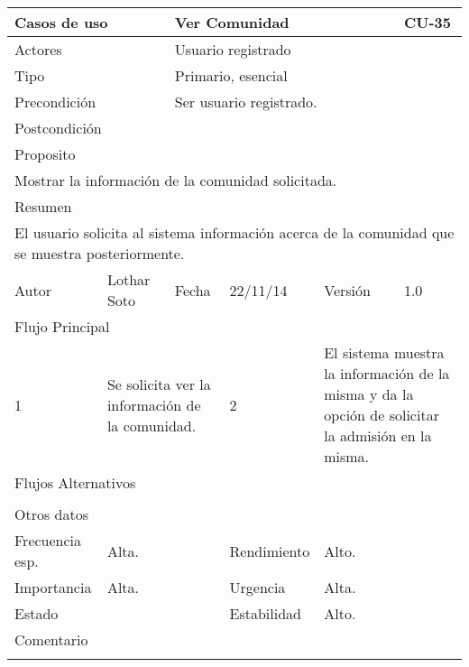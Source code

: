 \documentclass{article}
\begin{document}
\begin{table}[h]
\begin{tabular}{|l|l|l|l|l|l|}
\hline
\multicolumn{2}{|p{2cm}|}{Casos de uso}  & \multicolumn{3}{p{7cm}|}{Ver Comunidad} & CU-35 \\
\hline
\multicolumn{2}{|p{2cm}|}{Actores}       & \multicolumn{4}{p{8cm}|}{Usuario registrado}        \\
\hline
\multicolumn{2}{|p{2cm}|}{Tipo}          & \multicolumn{4}{p{8cm}|}{Primario, esencial}        \\
\hline
\multicolumn{2}{|p{2cm}|}{Precondición}  & \multicolumn{4}{p{8cm}|}{Ser usuario registrado.}        \\
\hline
\multicolumn{2}{|p{2cm}|}{Postcondición} & \multicolumn{4}{p{8cm}|}{}        \\
\hline
\multicolumn{6}{|p{10cm}|}{Proposito}                                   \\
\hline
\multicolumn{6}{|p{10cm}|}{Mostrar la información de la comunidad solicitada.}                                            \\
\hline
\multicolumn{6}{|p{10cm}|}{Resumen}                                 \\
\hline
\multicolumn{6}{|p{10cm}|}{El usuario solicita al sistema información acerca de la comunidad que se muestra posteriormente.}                                            \\
\hline
Autor         &       Lothar Soto        &  Fecha   &  22/11/14   &   Versión  & 1.0\\
\hline
\multicolumn{6}{|p{10cm}|}{Flujo Principal}\\
\hline
\multicolumn{1}{|p{1cm}|}{1} & \multicolumn{2}{p{3cm}}{Se solicita ver la información de la comunidad.} & \multicolumn{1}{|p{1cm}|}{2} & \multicolumn{2}{p{3cm}|}{El sistema muestra la información de la misma y da la opción de solicitar la admisión en la misma.}\\
\hline
\multicolumn{6}{|p{10cm}|}{Flujos Alternativos}\\
\hline
\multicolumn{1}{|p{1cm}}{} & \multicolumn{5}{|p{9cm}|}{}\\
\hline
\multicolumn{6}{|p{10cm}|}{Otros datos}\\
\hline
\multicolumn{1}{|p{2cm}|}{Frecuencia esp.} & \multicolumn{2}{p{3cm}}{Alta.} & \multicolumn{1}{|p{2cm}|}{Rendimiento} & \multicolumn{2}{p{3cm}|}{Alto.}\\
\hline
\multicolumn{1}{|p{2cm}|}{Importancia} & \multicolumn{2}{p{3cm}}{Alta.} & \multicolumn{1}{|p{2cm}|}{Urgencia} & \multicolumn{2}{p{3cm}|}{Alta.}\\
\hline
\multicolumn{1}{|p{2cm}|}{Estado} & \multicolumn{2}{p{3cm}}{} & \multicolumn{1}{|p{2cm}|}{Estabilidad} & \multicolumn{2}{p{3cm}|}{Alto.}\\
\hline
\multicolumn{6}{|p{10cm}|}{Comentario}\\
\hline
\multicolumn{6}{|p{10cm}|}{}\\
\hline
\end{tabular}
\end{table}
\end{document}
